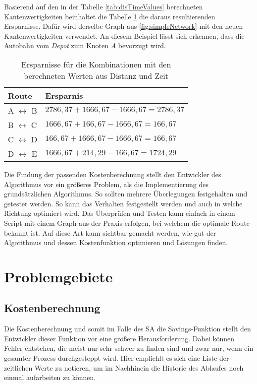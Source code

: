 \noindent
Basierend auf den in der Tabelle \ref{tab:disTimeValues} berechneten Kantenwertigkeiten beinhaltet die Tabelle \ref{tab:savingsDZ} die daraus resultierenden Ersparnisse. 
Dafür wird derselbe Graph aus \ref{fig:simpleNetwork} mit den neuen Kantenwertigkeiten verwendet. 
An diesem Beispiel lässt sich erkennen, dass die Autobahn vom \textit{Depot} zum Knoten \textit{A} bevorzugt wird. 
\begin{table}[htb]%
\centering
\begin{tabular}{p{3cm}|p{7cm}}
Route & Ersparnis \\ 
\hline 
A $\leftrightarrow$ B & $2786,37 + 1666,67 - 1666,67 = 2786,37$ \\ 
B $\leftrightarrow$ C & $1666,67 + 166,67 - 1666,67 = 166,67$ \\ 
C $\leftrightarrow$ D & $166,67 + 1666,67 - 1666,67 = 166,67$ \\ 
D $\leftrightarrow$ E & $1666,67 + 214,29 - 166,67 = 1724,29$ \\ 
\end{tabular} 
\caption{Ersparnisse für die Kombinationen mit den berechneten Werten aus Distanz und Zeit}
\label{tab:savingsDZ}
\end{table}

\noindent
Die Findung der passenden Kostenberechnung stellt den Entwickler des Algorithmus vor ein größeres Problem, als die Implementierung des grundsätzlichen Algorithmus. 
So sollten mehrere Überlegungen festgehalten und getestet werden. 
So kann das Verhalten festgestellt werden und auch in welche Richtung optimiert wird. 
Das Überprüfen und Testen kann einfach in einem Script mit einem Graph aus der Praxis erfolgen, bei welchem die optimale Route bekannt ist. 
Auf diese Art kann sichtbar gemacht werden, wie gut der Algorithmus und dessen Kostenfunktion optimieren und Lösungen finden. 

\chapter{Problemgebiete}

\section{Kostenberechnung}

Die Kostenberechnung und somit im Falle des SA die Savings-Funktion stellt den Entwickler dieser Funktion vor eine größere Herausforderung. 
Dabei können Fehler entstehen, die meist nur sehr schwer zu finden sind und zwar nur, wenn ein gesamter Prozess durchgesteppt wird. 
Hier empfiehlt es sich eine Liste der zeitlichen Werte zu notieren, um im Nachhinein die Historie des Ablaufes noch einmal aufarbeiten zu können. 

